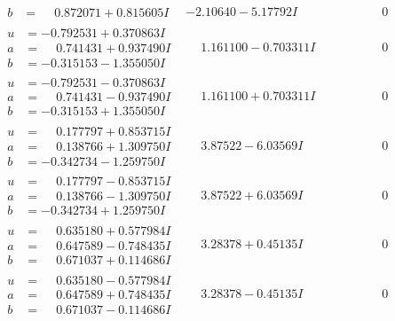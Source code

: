 \documentclass[1p]{elsarticle_modified}
\theoremstyle{definition}
\begin{document}
$$\begin{array}{c|c|c}
\begin{aligned}
b &= \phantom{-}0.872071 + 0.815605 I\end{aligned}
 & -2.10640 - 5.17792 I & \phantom{-0.000000 } 0 \\ \hline\begin{aligned}
u &= -0.792531 + 0.370863 I \\
a &= \phantom{-}0.741431 + 0.937490 I \\
b &= -0.315153 - 1.355050 I\end{aligned}
 & \phantom{-}1.161100 - 0.703311 I & \phantom{-0.000000 } 0 \\ \hline\begin{aligned}
u &= -0.792531 - 0.370863 I \\
a &= \phantom{-}0.741431 - 0.937490 I \\
b &= -0.315153 + 1.355050 I\end{aligned}
 & \phantom{-}1.161100 + 0.703311 I & \phantom{-0.000000 } 0 \\ \hline\begin{aligned}
u &= \phantom{-}0.177797 + 0.853715 I \\
a &= \phantom{-}0.138766 + 1.309750 I \\
b &= -0.342734 - 1.259750 I\end{aligned}
 & \phantom{-}3.87522 - 6.03569 I & \phantom{-0.000000 } 0 \\ \hline\begin{aligned}
u &= \phantom{-}0.177797 - 0.853715 I \\
a &= \phantom{-}0.138766 - 1.309750 I \\
b &= -0.342734 + 1.259750 I\end{aligned}
 & \phantom{-}3.87522 + 6.03569 I & \phantom{-0.000000 } 0 \\ \hline\begin{aligned}
u &= \phantom{-}0.635180 + 0.577984 I \\
a &= \phantom{-}0.647589 - 0.748435 I \\
b &= \phantom{-}0.671037 + 0.114686 I\end{aligned}
 & \phantom{-}3.28378 + 0.45135 I & \phantom{-0.000000 } 0 \\ \hline\begin{aligned}
u &= \phantom{-}0.635180 - 0.577984 I \\
a &= \phantom{-}0.647589 + 0.748435 I \\
b &= \phantom{-}0.671037 - 0.114686 I\end{aligned}
 & \phantom{-}3.28378 - 0.45135 I & \phantom{-0.000000 } 0\\

\end{array}$$
\end{document}
